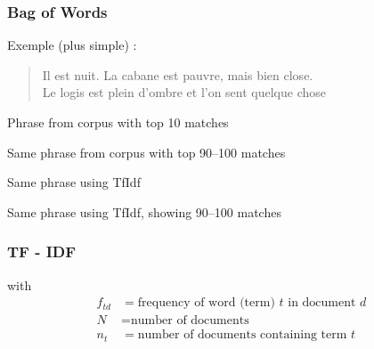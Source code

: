 \begin{frame}[t]
  \frametitle{Bag of Words}
  \vspace{1cm}
  Exemple (plus simple) :

  \begin{quote}
    Il est nuit. La cabane est pauvre, mais bien close.\\
    Le logis est plein d'ombre et l'on sent quelque chose\\
  \end{quote}

\end{frame}

\begin{frame}
  Phrase from corpus with top 10 matches
\end{frame}

\begin{frame}
  Same phrase from corpus with top 90--100 matches
\end{frame}

\begin{frame}
  Same phrase using TfIdf
\end{frame}

\begin{frame}
  Same phrase using TfIdf, showing 90--100 matches
\end{frame}

\begin{frame}
  \frametitle{TF - IDF}

  with
  \begin{align*}
    f_{td} &= \mbox{frequency of word (term) $t$ in document $d$} \\
    N &= \mbox{number of documents}\\
    n_t &= \mbox{number of documents containing term $t$}
  \end{align*}
\end{frame}

